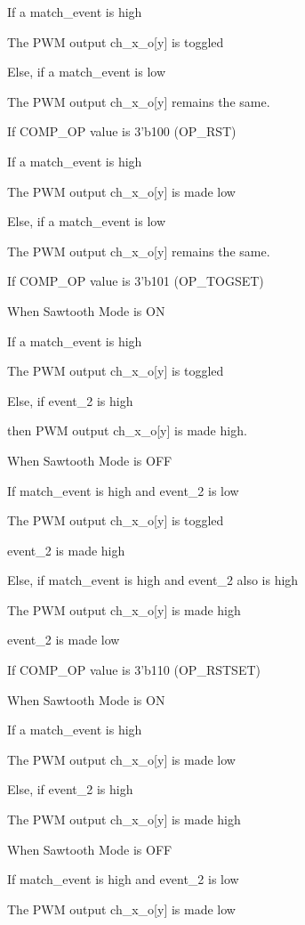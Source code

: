         If a match_event is high

            The PWM output ch_x_o[y] is toggled

        Else, if a match_event is low

            The PWM output ch_x_o[y] remains the same.

    If COMP_OP value is 3’b100 (OP_RST)

        If a match_event is high

            The PWM output ch_x_o[y] is made low

        Else, if a match_event is low

            The PWM output ch_x_o[y] remains the same.

    If COMP_OP value is 3’b101 (OP_TOGSET)

        When Sawtooth Mode is ON

            If a match_event is high

                The PWM output ch_x_o[y] is toggled

            Else, if event_2 is high

                then PWM output ch_x_o[y] is made high.

        When Sawtooth Mode is OFF

            If match_event is high and event_2 is low

                The PWM output ch_x_o[y] is toggled

                event_2 is made high

            Else, if match_event is high and event_2 also is high

                The PWM output ch_x_o[y] is made high

                event_2 is made low

    If COMP_OP value is 3’b110 (OP_RSTSET)

        When Sawtooth Mode is ON

            If a match_event is high

                The PWM output ch_x_o[y] is made low

            Else, if event_2 is high

                The PWM output ch_x_o[y] is made high

        When Sawtooth Mode is OFF

            If match_event is high and event_2 is low

                The PWM output ch_x_o[y] is made low

